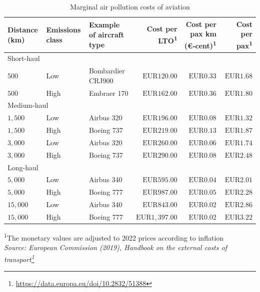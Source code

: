 \documentclass[
  11pt,
  a4paper,
]{book}
\DeclareRobustCommand{\href}[2]{#2\footnote{\url{#1}}}
\begin{document}
\hypertarget{tbl-marginal-pollution-cost}{}
\setlength{\LTpost}{0mm}
\begin{longtable}{lllrrr}
\caption{\label{tbl-marginal-pollution-cost}Marginal air pollution costs of aviation }\tabularnewline

\toprule
Distance (km) & Emissions class & Example of aircraft type & Cost per LTO\textsuperscript{1} & Cost per pax km (€-cent)\textsuperscript{1} & Cost per pax\textsuperscript{1} \\ 
\midrule
\multicolumn{6}{l}{Short-haul} \\ 
\midrule
$500$ & Low & Bombardier CRJ900 & $\text{EUR}120.00$ & $\text{EUR}0.33$ & $\text{EUR}1.68$ \\ 
$500$ & High & Embraer 170 & $\text{EUR}162.00$ & $\text{EUR}0.36$ & $\text{EUR}1.80$ \\ 
\midrule
\multicolumn{6}{l}{Medium-haul} \\ 
\midrule
$1,500$ & Low & Airbus 320 & $\text{EUR}196.00$ & $\text{EUR}0.08$ & $\text{EUR}1.32$ \\ 
$1,500$ & High & Boeing 737 & $\text{EUR}219.00$ & $\text{EUR}0.13$ & $\text{EUR}1.87$ \\ 
$3,000$ & Low & Airbus 320 & $\text{EUR}260.00$ & $\text{EUR}0.06$ & $\text{EUR}1.74$ \\ 
$3,000$ & High & Boeing 737 & $\text{EUR}290.00$ & $\text{EUR}0.08$ & $\text{EUR}2.48$ \\ 
\midrule
\multicolumn{6}{l}{Long-haul} \\ 
\midrule
$5,000$ & Low & Airbus 340 & $\text{EUR}595.00$ & $\text{EUR}0.04$ & $\text{EUR}2.01$ \\ 
$5,000$ & High & Boeing 777 & $\text{EUR}987.00$ & $\text{EUR}0.05$ & $\text{EUR}2.28$ \\ 
$15,000$ & Low & Airbus 340 & $\text{EUR}843.00$ & $\text{EUR}0.02$ & $\text{EUR}2.86$ \\ 
$15,000$ & High & Boeing 777 & $\text{EUR}1,397.00$ & $\text{EUR}0.02$ & $\text{EUR}3.22$ \\ 
\bottomrule
\end{longtable}
\begin{minipage}{\linewidth}
\textsuperscript{1}The monetary values are adjusted to 2022 prices according to inflation\\
\emph{Source: \href{https://data.europa.eu/doi/10.2832/51388}{European Commission (2019), Handbook on the external costs of transport}}\\
\end{minipage}
\end{document}
